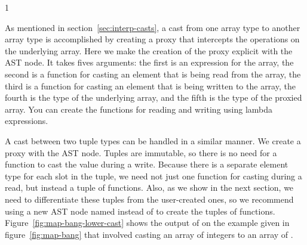 \documentclass[7x10]{TimesAPriori_MIT}%
\def\pythonEd{1}
\def\edition{1}
\newcommand{\pythonColor}[0]{}
\numberwithin{theorem}{chapter}
\numberwithin{definition}{chapter}
\numberwithin{equation}{chapter}
\begin{document}
{\if\edition\pythonEd\pythonColor

As mentioned in section~\ref{sec:interp-casts}, a cast from one array
type to another array type is accomplished by creating a proxy that
intercepts the operations on the underlying array. Here we make the
creation of the proxy explicit with the  AST node. It
takes fives arguments: the first is an expression for the array, the
second is a function for casting an element that is being read from
the array, the third is a function for casting an element that is
being written to the array, the fourth is the type of the underlying
array, and the fifth is the type of the proxied array.  You can create
the functions for reading and writing using lambda expressions.

A cast between two tuple types can be handled in a similar manner.  We
create a proxy with the  AST node.  Tuples are
immutable, so there is no need for a function to cast the value during
a write.  Because there is a separate element type for each slot in
the tuple, we need not just one function for casting during a read,
but instead a tuple of functions.
%
Also, as we show in the next section, we need to differentiate these
tuples from the user-created ones, so we recommend using a new AST
node named  instead of  to create the
tuples of functions.
%
Figure~\ref{fig:map-bang-lower-cast} shows the output of
 on the example given in figure~\ref{fig:map-bang}
that involved casting an array of integers to an array of \CANYTY{}.

\fi}
\end{document}
